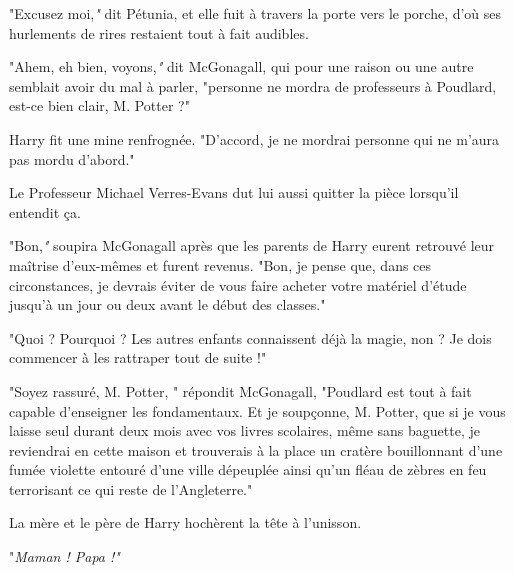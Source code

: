 "Excusez moi,\emph{"}  dit Pétunia, et elle fuit à travers la porte vers le porche, d'où ses hurlements de rires restaient tout à fait audibles.

"Ahem, eh bien, voyons,\emph{"}  dit McGonagall, qui pour une raison ou une autre semblait avoir du mal à parler, "personne ne mordra de professeurs à Poudlard, est-ce bien clair, M. Potter ?"

Harry fit une mine renfrognée. "D'accord, je ne mordrai personne qui ne m'aura pas mordu d'abord."

Le Professeur Michael Verres-Evans dut lui aussi quitter la pièce lorsqu'il entendit ça.

"Bon,\emph{"}  soupira McGonagall après que les parents de Harry eurent retrouvé leur maîtrise d'eux-mêmes et furent revenus. "Bon, je pense que, dans ces circonstances, je devrais éviter de vous faire acheter votre matériel d'étude jusqu'à un jour ou deux avant le début des classes."

"Quoi ? Pourquoi ? Les autres enfants connaissent déjà la magie, non ? Je dois commencer à les rattraper tout de suite !"

"Soyez rassuré, M. Potter, " répondit McGonagall, "Poudlard est tout à fait capable d'enseigner les fondamentaux. Et je soupçonne, M. Potter, que si je vous laisse seul durant deux mois avec vos livres scolaires, même sans baguette, je reviendrai en cette maison et trouverais à la place un cratère bouillonnant d'une fumée violette entouré d'une ville dépeuplée ainsi qu'un fléau de zèbres en feu terrorisant ce qui reste de l'Angleterre."

La mère et le père de Harry hochèrent la tête à l'unisson.

"\emph{Maman ! Papa !"} 


